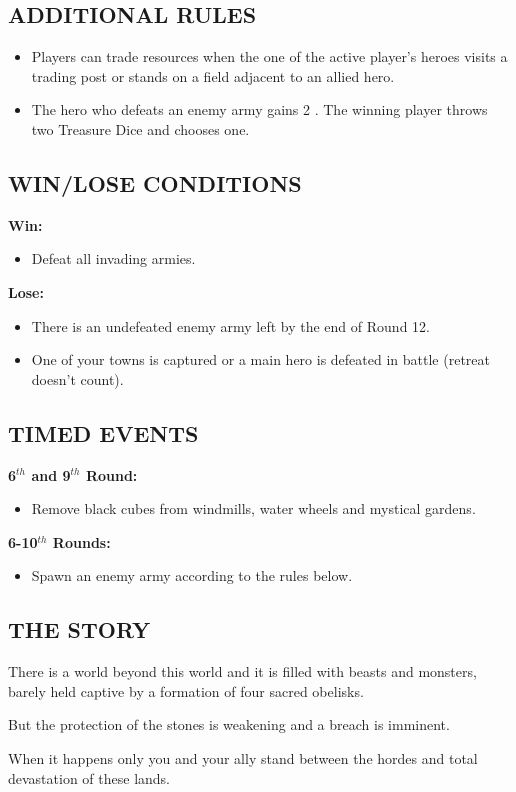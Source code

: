 \begin{multicols*}{2}
\subsection*{\MakeUppercase{Additional rules}}

\begin{itemize}
    \item Players can trade resources when the one of the active player's heroes 
    visits a trading post or stands on a field adjacent to an allied hero.
    \item The hero who defeats an enemy army gains 2 .
    The winning player throws two Treasure Dice and chooses one.
\end{itemize}

\subsection*{\MakeUppercase{Win/lose conditions}}

\textbf{Win:}
\begin{itemize}
    \item Defeat all invading armies.
\end{itemize}

\textbf{Lose:}
\begin{itemize}
    \item There is an undefeated enemy army left by the end of Round 12.
    \item One of your towns is captured or a main hero is defeated in battle 
    (retreat doesn't count).
\end{itemize}

\subsection*{\MakeUppercase{Timed events}}

\textbf{6$^{th}$ and 9$^{th}$ Round:}
\begin{itemize}
    \item Remove black cubes from windmills, water wheels and mystical gardens.
\end{itemize}

\textbf{6-10$^{th}$ Rounds:}
\begin{itemize}
    \item Spawn an enemy army according to the rules below.
\end{itemize}

\subsection*{\MakeUppercase{The story}}

There is a world beyond this world and it is filled with beasts and monsters, 
barely held captive by a formation of four sacred obelisks.

But the protection of the stones is weakening and a breach is imminent.

When it happens only you and your ally stand between the hordes and total 
devastation of these lands.

\end{multicols*}

